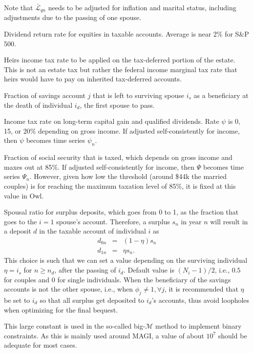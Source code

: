 \documentclass{report}[fleqn,12pt]
\begin{document}
\begin{description}[leftmargin=4em,style=multiline]
        Note that $\bar{\mathcal{L}}_{qn}$ needs to be adjusted for inflation and marital status,
        including adjustments due to the passing of one spouse.
\item [$\mu$]
	Dividend return rate for equities in taxable accounts. Average is near 2\% for S\&P 500.
\item [$\nu$]
	Heirs income tax rate to be applied on the tax-deferred portion of the estate. This is not an estate tax
	but rather the federal income marginal tax rate that heirs would have to pay on inherited tax-deferred accounts.
\item [$\phi_j$]
	Fraction of savings account $j$ that is left to surviving spouse $i_s$ as a beneficiary
	at the death of individual $i_d$, the first spouse to pass.
\item [$\psi$]
	Income tax rate on long-term capital gain and qualified dividends. Rate $\psi$ is 0, 15, or 20\%
	depending on gross income. If adjusted self-consistently for income, then $\psi$ becomes
 	time series $\psi_n$.
\item [$\Psi$]
	Fraction of social security that is taxed, which depends on gross income and maxes out at 85\%.
        If adjusted self-consistently for income, then $\Psi$ becomes time series $\Psi_n$. However,
	given how low the threshold (around \$44k the married couples) is for reaching the
	maximum taxation level of 85\%, it is fixed at this value in Owl.
\item [$\eta$]
	Spousal ratio for surplus deposits, which goes from 0 to 1, as the fraction
	that goes to the $i = 1$ spouse's account. Therefore, a surplus $s_n$ in year $n$
	will result in a deposit $d$ in the taxable account of individual $i$ as
	\begin{eqnarray}
		\label{Eq:eta}
		d_{0n} & = & (1 - \eta) s_n \nonumber\\
		d_{1n} & = & \eta s_n.
	\end{eqnarray}
	This choice is such that we can set a value depending on the surviving
	individual $\eta = i_s$ for $n \ge n_d$, after the passing of $i_d$.
	Default value is $(N_i - 1)/2$, i.e., $0.5$ for couples and $0$ for single individuals.
	When the beneficiary of the savings accounts is not the other spouse, i.e., 
	when $\phi_j \neq 1, \forall j$, it is recommended that $\eta$ be set to $i_d$ so that
	all surplus get deposited to $i_d$'s accounts,
	thus avoid loopholes when optimizing for the final bequest.
\item[$\mathcal{M}$]
	This large constant is used in the so-called big-$\mathcal{M}$ method to implement
	binary constraints. As this is mainly used around MAGI, a value of about $10^7$ should
	be adequate for most cases.
\end{description}
\end{document}
